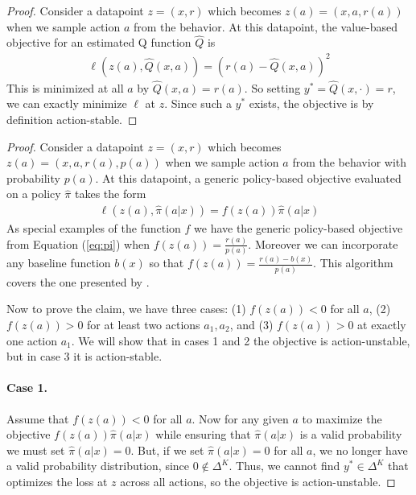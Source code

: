 \clearpage
\begin{subappendices}
\label{app:stable}

\vbstable*

\begin{proof}
Consider a datapoint $ z= (x,r)$ which becomes $ z(a) = (x, a, r(a))$ when we sample action $ a$ from the behavior. At this datapoint, the value-based objective for an estimated Q function $ \hat Q$ is
\begin{align}
    \ell(z(a), \hat Q(x, a)) = (r(a) - \hat Q(x,a))^2
\end{align}
This is minimized at all $ a $ by $\hat Q(x,a) = r(a)$. So setting $ y^* = \hat Q(x, \cdot) = r$, we can exactly minimize $ \ell$ at $ z$. Since such a $ y^*$ exists, the objective is by definition action-stable.
\end{proof}



\pbstable*

\begin{proof}
Consider a datapoint $ z= (x,r)$ which becomes $ z(a) = (x, a, r(a), p(a))$ when we sample action $ a$ from the behavior with probability $ p(a)$. At this datapoint, a generic policy-based objective evaluated on a policy $ \hat \pi $ takes the form
\begin{align}
    \ell(z(a), \hat \pi(a|x)) = f(z(a)) \hat \pi(a|x)
\end{align}
As special examples of the function $ f $ we have the generic policy-based objective from Equation (\ref{eq:pi}) when $ f(z(a)) = \frac{r(a)}{p(a)}$. Moreover we can incorporate any baseline function $ b(x)$ so that $ f(z(a)) = \frac{r(a) - b(x)}{p(a)}$. This algorithm covers the one presented by \citet{joachims2018deep}.

Now to prove the claim, we have three cases: (1) $ f(z(a)) < 0$ for all $ a$, (2) $ f(z(a)) > 0 $ for at least two actions $ a_1, a_2$, and (3) $ f(z(a)) > 0$ at exactly one action $ a_1$. We will show that in cases 1 and 2 the objective is action-unstable, but in case 3 it is action-stable.

\paragraph{Case 1.} Assume that $ f(z(a)) < 0$ for all $ a$. Now for any given $ a $ to maximize the objective $f(z(a))\hat \pi(a|x)$ while ensuring that $ \hat \pi(a|x) $ is a valid probability we must set $ \hat \pi(a|x) = 0$. But, if we set $ \hat\pi(a|x) = 0$ for all $ a$, we no longer have a valid probability distribution, since $ 0 \not \in \Delta^K$. Thus, we cannot find $ y^* \in \Delta^K$ that optimizes the loss at $ z $ across all actions, so the objective is action-unstable.


\end{proof}
\end{subappendices}
